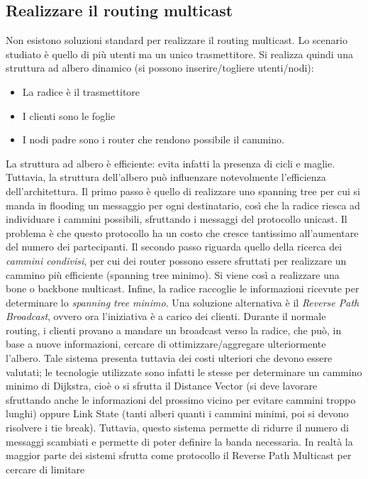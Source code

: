 \subsection{Realizzare il routing multicast}
Non esistono soluzioni standard per realizzare il routing multicast. Lo scenario studiato è quello di più utenti ma un
unico trasmettitore. Si realizza quindi una struttura ad albero dinamico (si possono inserire/togliere utenti/nodi):
\begin{itemize}
 \item La radice è il trasmettitore
 \item I clienti sono le foglie
 \item I nodi padre sono i router che rendono possibile il cammino.
\end{itemize}
La struttura ad albero è efficiente: evita infatti la presenza di cicli e maglie.
Tuttavia, la struttura dell'albero può influenzare notevolmente l'efficienza dell'architettura.
Il primo passo è quello di realizzare uno spanning tree per cui si manda in flooding un messaggio per ogni destinatario,
così che la radice riesca ad individuare i cammini possibili, sfruttando i messaggi del protocollo unicast. Il
problema è che questo protocollo ha un costo che cresce tantissimo all'aumentare del numero dei partecipanti.
Il secondo passo riguarda quello della ricerca dei \textit{cammini condivisi}, per cui dei router possono essere
sfruttati per realizzare un cammino più efficiente (spanning tree minimo). Si viene così a realizzare una bone o
backbone multicast.
Infine, la radice raccoglie le informazioni ricevute per determinare lo \textit{spanning tree minimo}.
Una soluzione alternativa è il \textit{Reverse Path Broadcast}, ovvero ora l'iniziativa è a carico dei clienti. Durante
il normale routing, i clienti provano a mandare un broadcast verso la radice, che può, in base a nuove informazioni,
cercare di ottimizzare/aggregare ulteriormente l'albero. Tale sistema presenta tuttavia dei costi ulteriori che devono
essere valutati; le tecnologie utilizzate sono infatti le stesse per determinare un cammino minimo di Dijkstra, cioè o
si sfrutta il Distance Vector (si deve lavorare sfruttando anche le informazioni del prossimo vicino per evitare cammini
troppo lunghi) oppure Link State (tanti alberi quanti i cammini minimi, poi si devono risolvere i tie break). Tuttavia,
questo sistema permette di ridurre il numero di messaggi scambiati e permette di poter definire la banda necessaria.
In realtà la maggior parte dei sistemi sfrutta come protocollo il Reverse Path Multicast per cercare di limitare
